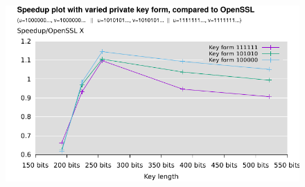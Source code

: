 \begin{frame}
\begin{figure}\flushleft		
\includegraphics[scale=0.9, trim={0 0 0 0}]{keysize}		
\end{figure}
\end{frame}